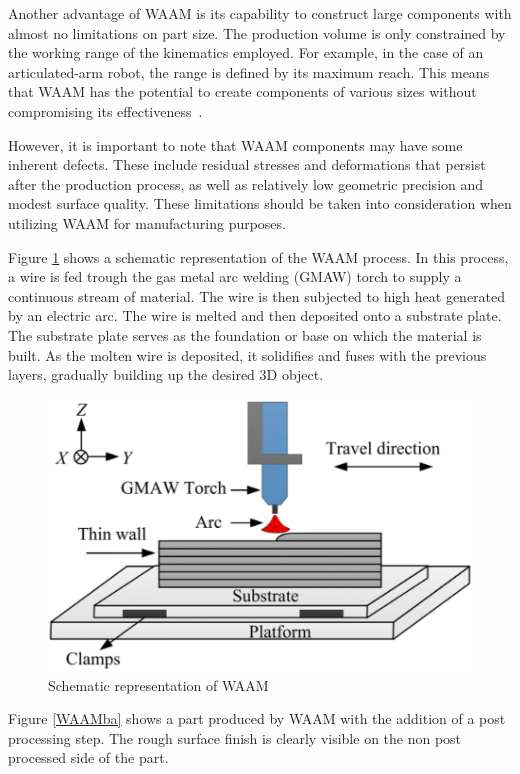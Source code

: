 Another advantage of WAAM is its capability to construct large components with almost no limitations on part size. The production volume is only constrained by the working range of the kinematics employed. For example, in the case of an articulated-arm robot, the range is defined by its maximum reach. This means that WAAM has the potential to create components of various sizes without compromising its effectiveness~\cite{Li.2019}.

However, it is important to note that WAAM components may have some inherent defects. These include residual stresses and deformations that persist after the production process, as well as relatively low geometric precision and modest surface quality. These limitations should be taken into consideration when utilizing WAAM for manufacturing purposes. \cite{Wu.2018}

Figure \ref{WAAM} shows a schematic representation of the WAAM process. In this process, a wire is fed trough the gas metal arc welding (GMAW) torch to supply a continuous stream of material. The wire is then subjected to high heat generated by an electric arc. The wire is melted and then deposited onto a substrate plate. The substrate plate serves as the foundation or base on which the material is built. As the molten wire is deposited, it solidifies and fuses with the previous layers, gradually building up the desired 3D object.

\begin{figure}[H]
	\centerline{\includegraphics[scale=1.2]{figures/WAAM.png}}
	\caption{Schematic representation of WAAM~\cite{Chaurasia.}}
	\label{WAAM}
\end{figure}

Figure \ref{WAAMba} shows a part produced by WAAM with the addition of a post processing step. The rough surface finish is clearly visible on the non post processed side of the part.

